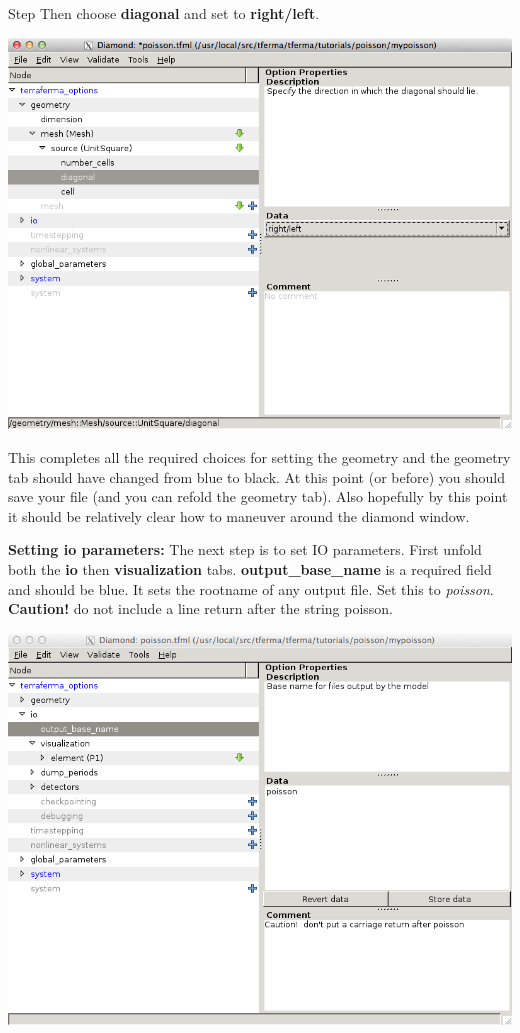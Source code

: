 \begin{steps}{Step}
Then choose \textbf{diagonal} and set to \textbf{right/left}. 
\begin{center}
    \includegraphics[width=\diamondwidth]{figures/screendumps/diamond_poisson_03d.png}
\end{center}
This completes all the required choices for setting the geometry and
the geometry tab should have changed from blue to black. At this point
(or before) you should save your file (and you can refold the geometry
tab). Also hopefully by this point it
  should be relatively clear how to maneuver around the diamond
  window.  
\item \textbf{Setting io parameters:}  The next step is to set IO
  parameters.
First unfold both the \textbf{io} then \textbf{visualization} tabs.
\textbf{output\_base\_name} is a required field and should be blue. It sets the
rootname of any output file.  Set this to \emph{poisson}.
\textbf{Caution!} do not include a line return after the string poisson. 
\begin{center}
    \includegraphics[width=\diamondwidth]{figures/screendumps/diamond_poisson_04.png}

\end{center}
\end{steps}
